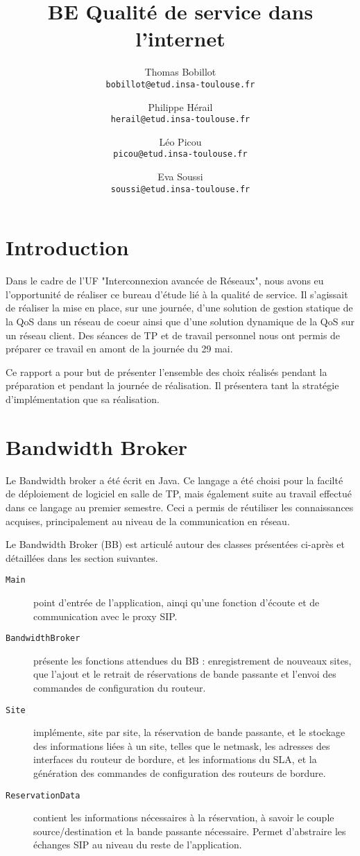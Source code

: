 \documentclass[a4paper,11pt]{article}
\title{BE Qualité de service dans l'internet \\[0.1em]\textsmaller[]{4IR SC - INSA Toulouse - DGEI}}
\author{
    Thomas Bobillot\\
    \texttt{bobillot@etud.insa-toulouse.fr}
 \and
  Philippe Hérail\\
  \texttt{herail@etud.insa-toulouse.fr}
 \and
  Léo Picou\\
\texttt{picou@etud.insa-toulouse.fr}
 \and
  Eva Soussi \\
  \texttt{soussi@etud.insa-toulouse.fr}
  }
\let\Oldsection\section
\renewcommand{\section}{\FloatBarrier\Oldsection}
\begin{document}
\maketitle

\tableofcontents

\cleardoublepage

\section{Introduction}

Dans le cadre de l’UF "Interconnexion avancée de Réseaux", nous avons eu l’opportunité de réaliser ce bureau d’étude lié à la qualité de service. Il s’agissait de réaliser la mise en place, sur une journée, d’une solution de gestion statique de la QoS dans un réseau de coeur ainsi que d’une solution dynamique de la QoS sur un réseau client. Des séances de TP et de travail personnel nous ont permis de préparer ce travail en amont de la journée du 29 mai.

Ce rapport a pour but de présenter l’ensemble des choix réalisés pendant la préparation et pendant la journée de réalisation. Il présentera tant la stratégie d'implémentation que sa réalisation.

\section{Bandwidth Broker}
Le Bandwidth broker a été écrit en Java. Ce langage a été choisi pour la facilté de déploiement de logiciel en salle de TP, mais également suite au travail effectué dans ce langage au premier semestre. Ceci a permis de réutiliser les connaissances acquises, principalement au niveau de la communication en réseau.

Le Bandwidth Broker (BB) est articulé autour des classes présentées ci-après et détaillées dans les section suivantes.

\begin{description}
    \item[\texttt{Main}] point d'entrée de l'application, ainqi qu'une fonction d'écoute et de communication avec le proxy SIP.
    \item[\texttt{BandwidthBroker}] présente les fonctions attendues du BB : enregistrement de nouveaux sites, que l'ajout et le retrait de réservations de bande passante et l'envoi des commandes de configuration du routeur.
    \item[\texttt{Site}] implémente, site par site, la réservation de bande passante, et le stockage des informations liées à un site, telles que le netmask, les adresses des interfaces du routeur de bordure, et les informations du SLA, et la génération des commandes de configuration des routeurs de bordure.
    \item[\texttt{ReservationData}] contient les informations nécessaires à la réservation, à savoir le couple source\slash destination et la bande passante nécessaire. Permet d'abstraire les échanges SIP au niveau du reste de l'application.
\end{description}
\end{document}
